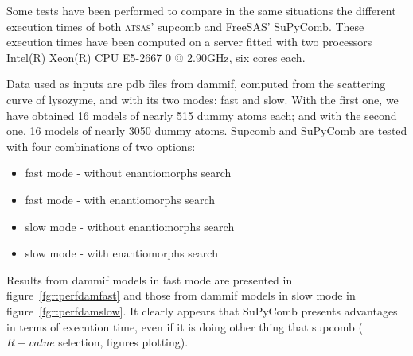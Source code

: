 \documentclass[a4paper, 11pt]{report}
\begin{document}
Some tests have been performed to compare in the same situations the 
different execution times of both \textsc{atsas}' supcomb and FreeSAS' 
SuPyComb. 
These execution times have been computed on a server 
fitted with two processors Intel(R) Xeon(R) CPU E5-2667 0 @ 2.90GHz, 
six cores each.

Data used as inputs are pdb files from dammif, computed from the 
scattering curve of lysozyme, and with its two modes: fast and slow. 
With the first one, we have obtained 16 models of nearly 515 dummy 
atoms each; and with the second one, 16 models of nearly 3050 dummy 
atoms. 
Supcomb and SuPyComb are tested with four combinations of two options: 
\begin{itemize}
\item fast mode - without enantiomorphs search
\item fast mode - with enantiomorphs search
\item slow mode - without enantiomorphs search
\item slow mode - with enantiomorphs search
\end{itemize}

Results from dammif models in fast mode are presented in 
figure~\ref{fgr:perfdamfast} and those from dammif models in slow mode 
in figure~\ref{fgr:perfdamslow}. 
It clearly appears that SuPyComb presents advantages in terms of 
execution time, even if it is doing other thing that supcomb 
($R-value$ selection, figures plotting).
\end{document}

